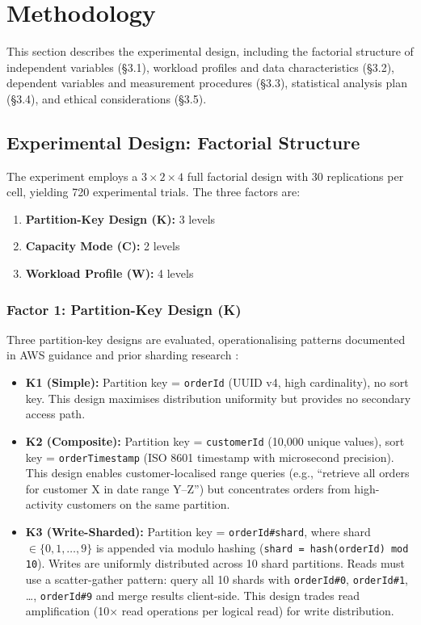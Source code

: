 \section{Methodology}

This section describes the experimental design, including the factorial structure of independent variables (§3.1), workload profiles and data characteristics (§3.2), dependent variables and measurement procedures (§3.3), statistical analysis plan (§3.4), and ethical considerations (§3.5).

\subsection{Experimental Design: Factorial Structure}

The experiment employs a $3 \times 2 \times 4$ full factorial design with 30 replications per cell, yielding 720 experimental trials. The three factors are:

\begin{enumerate}
    \item \textbf{Partition-Key Design (K):} 3 levels
    \item \textbf{Capacity Mode (C):} 2 levels  
    \item \textbf{Workload Profile (W):} 4 levels
\end{enumerate}

\subsubsection{Factor 1: Partition-Key Design (K)}

Three partition-key designs are evaluated, operationalising patterns documented in AWS guidance \citep{aws2025sharding} and prior sharding research \citep{eldeeb2022neuroshard}:

\begin{itemize}
    \item \textbf{K1 (Simple):} Partition key = \texttt{orderId} (UUID v4, high cardinality), no sort key. This design maximises distribution uniformity but provides no secondary access path.
    \item \textbf{K2 (Composite):} Partition key = \texttt{customerId} (10,000 unique values), sort key = \texttt{orderTimestamp} (ISO 8601 timestamp with microsecond precision). This design enables customer-localised range queries (e.g., ``retrieve all orders for customer X in date range Y–Z'') but concentrates orders from high-activity customers on the same partition.
    \item \textbf{K3 (Write-Sharded):} Partition key = \texttt{orderId\#shard}, where shard $\in \{0, 1, \ldots, 9\}$ is appended via modulo hashing (\texttt{shard = hash(orderId) mod 10}). Writes are uniformly distributed across 10 shard partitions. Reads must use a scatter-gather pattern: query all 10 shards with \texttt{orderId\#0}, \texttt{orderId\#1}, \ldots, \texttt{orderId\#9} and merge results client-side. This design trades read amplification (10× read operations per logical read) for write distribution.
\end{itemize}

